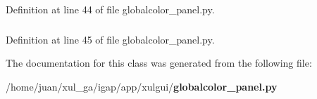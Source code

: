 Definition at line 44 of file globalcolor\_\-panel.py.
\subsubsection{}\label{classapp_1_1xulgui_1_1globalcolor__panel_1_1IndividualPanel_a37484c44df4241eff6379e1af3368fc}




Definition at line 45 of file globalcolor\_\-panel.py.

The documentation for this class was generated from the following file:\begin{CompactItemize}
\item 
/home/juan/xul\_\-ga/igap/app/xulgui/{\bf globalcolor\_\-panel.py}\end{CompactItemize}
